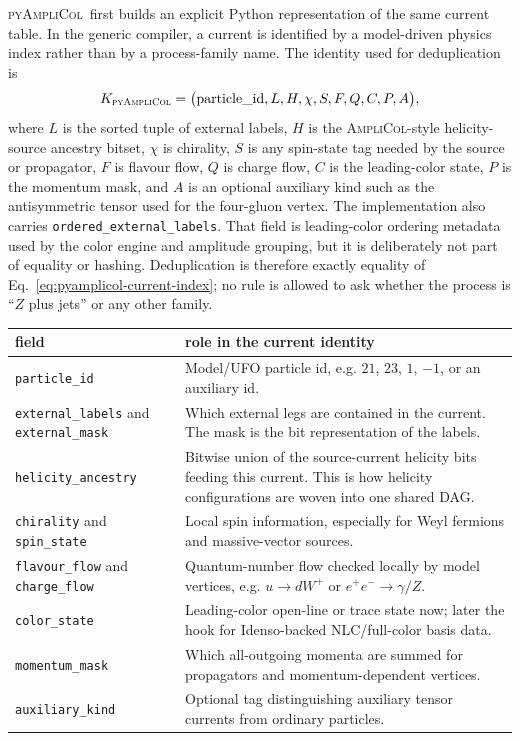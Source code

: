 \documentclass[10pt]{article}
\newcommand{\AC}{\textsc{AmpliCol}}
\newcommand{\PAC}{\textsc{pyAmpliCol}}
\begin{document}
\PAC\ first builds an explicit Python representation of the same current table.
In the generic compiler, a current is identified by a model-driven physics
index rather than by a process-family name.  The identity used for
deduplication is
\begin{equation}
  K_{\PAC} =
  \bigl(
    \mathrm{particle\_id}, L, H, \chi, S, F, Q, C, P, A
  \bigr),
  \label{eq:pyamplicol-current-index}
\end{equation}
where $L$ is the sorted tuple of external labels, $H$ is the
\AC-style helicity-source ancestry bitset, $\chi$ is chirality, $S$ is any
spin-state tag needed by the source or propagator, $F$ is flavour flow, $Q$ is
charge flow, $C$ is the leading-color state, $P$ is the momentum mask, and $A$
is an optional auxiliary kind such as the antisymmetric tensor used for the
four-gluon vertex.  The implementation also carries
\texttt{ordered\_external\_labels}.  That field is leading-color ordering
metadata used by the color engine and amplitude grouping, but it is deliberately
not part of equality or hashing.  Deduplication is therefore exactly equality
of Eq.~\eqref{eq:pyamplicol-current-index}; no rule is allowed to ask whether
the process is ``$Z$ plus jets'' or any other family.

\begin{center}
\begin{tabular}{@{}L{1.45in}L{4.95in}@{}}
\toprule
\textbf{field} & \textbf{role in the current identity} \\
\midrule
\texttt{particle\_id} & Model/UFO particle id, e.g. $21$, $23$, $1$, $-1$, or an auxiliary id. \\
\texttt{external\_labels} and \texttt{external\_mask} & Which external legs are contained in the current.  The mask is the bit representation of the labels. \\
\texttt{helicity\_ancestry} & Bitwise union of the source-current helicity bits feeding this current.  This is how helicity configurations are woven into one shared DAG. \\
\texttt{chirality} and \texttt{spin\_state} & Local spin information, especially for Weyl fermions and massive-vector sources. \\
\texttt{flavour\_flow} and \texttt{charge\_flow} & Quantum-number flow checked locally by model vertices, e.g. $u\to d W^+$ or $e^+e^-\to\gamma/Z$. \\
\texttt{color\_state} & Leading-color open-line or trace state now; later the hook for Idenso-backed NLC/full-color basis data. \\
\texttt{momentum\_mask} & Which all-outgoing momenta are summed for propagators and momentum-dependent vertices. \\
\texttt{auxiliary\_kind} & Optional tag distinguishing auxiliary tensor currents from ordinary particles. \\
\bottomrule
\end{tabular}
\end{center}
\end{document}
